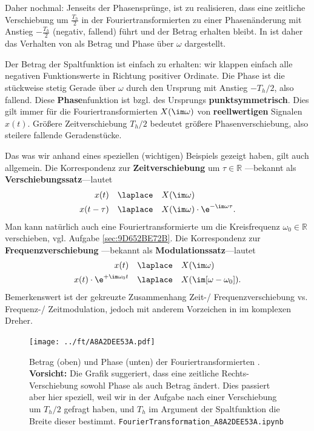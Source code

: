 \begin{Loesung}
Daher nochmal: Jenseits der Phasensprünge, ist zu realisieren, dass
eine zeitliche Verschiebung um $\frac{T_h}{2}$ in der Fouriertransformierten
zu einer Phasenänderung mit Anstieg $-\frac{T_h}{2}$ (negativ, fallend)
führt und der Betrag erhalten bleibt.
%
In  ist daher das Verhalten von  als
Betrag und Phase über $\omega$ dargestellt.

Der Betrag der Spaltfunktion ist einfach zu erhalten: wir klappen einfach alle
negativen Funktionswerte in Richtung positiver Ordinate.
%
Die Phase ist die stückweise stetig Gerade über $\omega$ durch den Ursprung
mit Anstieg $-T_h/2$, also fallend.
%
Diese \textbf{Phase}nfunktion ist bzgl. des Ursprungs \textbf{punktsymmetrisch}.
Dies gilt immer für die Fouriertransformierten $X(\im\omega)$ von \textbf{reellwertigen}
Signalen $x(t)$.
%
Größere Zeitverschiebung $T_h/2$ bedeutet größere Phasenverschiebung, also steilere
fallende Geradenstücke.

Das was wir anhand eines speziellen (wichtigen) Beispiels gezeigt haben, gilt auch
allgemein. Die Korrespondenz zur \textbf{Zeitverschiebung} um $\tau\in\mathbb{R}$
---bekannt als \textbf{Verschiebungssatz}---lautet
\begin{align}
x(t) & \quad \laplace \quad X(\im\omega)\\
x(t - \tau) & \quad \laplace \quad X(\im\omega) \cdot \e^{-\im\omega \tau}.
\end{align}
%
Man kann natürlich auch eine Fouriertransformierte um die Kreisfrequenz
$\omega_0\in\mathbb{R}$ verschieben, vgl. Aufgabe \ref{sec:9D652BE72B}.
%
Die Korrespondenz zur \textbf{Frequenzverschiebung}
---bekannt als \textbf{Modulationssatz}---lautet
\begin{align}
x(t) & \quad \laplace \quad X(\im\omega)\\
\label{eq:A8A2DEE53A_ModTheoremTime}
x(t) \cdot \e^{+\im\omega_0 t} & \quad \laplace \quad X(\im[\omega-\omega_0]).
\end{align}
%
Bemerkenswert ist der gekreuzte Zusammenhang Zeit-/ Frequenzverschiebung
vs.
Frequenz-/ Zeitmodulation,
jedoch mit anderem Vorzeichen
in im komplexen Dreher.
\end{Loesung}

\begin{figure}[h!]
\centering
\texttt{[image: ../ft/A8A2DEE53A.pdf]}
  \caption{Betrag (oben) und Phase (unten) der Fouriertransformierten .
\textbf{Vorsicht:} Die Grafik suggeriert, dass eine zeitliche Rechts-Verschiebung
sowohl Phase als auch Betrag ändert. Dies passiert aber hier speziell, weil wir in der
Aufgabe nach einer Verschiebung um $T_h/2$ gefragt haben, und $T_h$
im Argument der Spaltfunktion die Breite dieser bestimmt.
\texttt{FourierTransformation\_A8A2DEE53A.ipynb}}
  \label{fig:A8A2DEE53A}
\end{figure}


